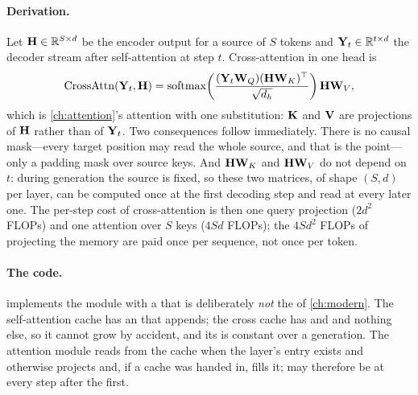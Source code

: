 \paragraph{Derivation.} Let $\mathbf{H}\in\mathbb R^{S\times d}$ be the encoder output for a source of
$S$ tokens and $\mathbf{Y}_t\in\mathbb R^{t\times d}$ the decoder stream after self-attention at step
$t$. Cross-attention in one head is
\begin{equation}
\mathrm{CrossAttn}(\mathbf{Y}_t,\mathbf{H}) = \operatorname{softmax}\!\left(\frac{(\mathbf{Y}_t\mathbf{W}_Q)(\mathbf{H}\mathbf{W}_K)^\top}{\sqrt{d_{h}}}\right)\mathbf{H}\mathbf{W}_V ,
\label{eq:encoders:cross}
\end{equation}
which is \cref{ch:attention}'s attention with one substitution: $\mathbf{K}$ and $\mathbf{V}$ are
projections of $\mathbf{H}$ rather than of $\mathbf{Y}_t$. Two consequences follow immediately. There is no
causal mask---every target position may read the whole source, and that is the point---only a
padding mask over source keys. And $\mathbf{H}\mathbf{W}_K$ and $\mathbf{H}\mathbf{W}_V$ do not depend on $t$: during
generation the source is fixed, so these two matrices, of shape $(S,d)$ per layer, can be computed
once at the first decoding step and read at every later one. The per-step cost of cross-attention is
then one query projection ($2d^2$ FLOPs) and one attention over $S$ keys ($4Sd$ FLOPs); the
$4Sd^2$ FLOPs of projecting the memory are paid once per sequence, not once per token.

\paragraph{The code.}  implements the module with a 
that is deliberately \emph{not} the  of \cref{ch:modern}. The self-attention cache has
an  that appends; the cross cache has  and  and nothing else, so it
cannot grow by accident, and its  is constant over a generation. The attention module
reads from the cache when the layer's entry exists and otherwise projects  and, if a
cache was handed in, fills it;  may therefore be  at every step after the
first.

